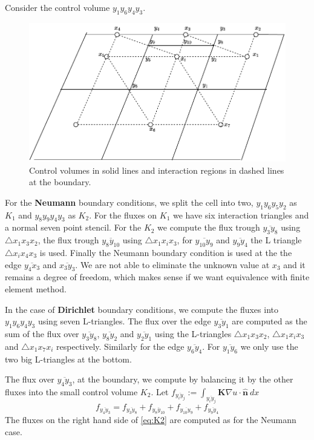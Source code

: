 \documentclass[../Main/main.tex]{subfiles}
\begin{document}
	Consider the control volume $y_1 y_6 y_4 y_3$. 
	\begin{figure}[H]
		\centering
		\includegraphics{modified_L_scheme.pdf}
		\caption{Control volumes in solid lines and interaction regions in dashed lines at the boundary.}
	\end{figure}
	For the \textbf{Neumann} boundary conditions, we split the cell into two, $y_1 y_6 y_5 y_2$ as $K_1$ and $y_8 y_9 y_4 y_3$ as  $K_2$. For the fluxes on $K_1$ we have six interaction triangles and a normal seven point stencil. For the $K_2$ we compute the flux trough $\overline{y_3 y_8}$ using $\triangle x_1 x_3 x_2$, the flux trough $\overline{y_8 y_{10}}$ using $\triangle x_1 x_i x_3$, for $\overline{y_{10}y_9}$ and $\overline{y_9 y_4}$ the L triangle  $\triangle x_i x_4 x_3$ is used. Finally the Neumann boundary condition is used at the the edge $\overline{y_4 x_3}$ and $\overline{x_3 y_3}$. We are not able to eliminate the unknown value at $x_3$ and it remains a degree of freedom, which makes sense if we want equivalence with finite element method.
	\par
	In the case of \textbf{Dirichlet} boundary conditions, we compute the fluxes into $y_1 y_6 y_4 y_3$ using seven L-triangles. The flux over the edge $\overline{y_3 y_1}$ are computed as the sum of the flux over $\overline{y_3 y_8}$, $\overline{y_8 y_2}$ and $\overline{y_2 y_1}$ using the L-triangles $\triangle x_1 x_3 x_2$, $\triangle x_1 x_i x_3$ and $\triangle x_1 x_7 x_i$ respectively. Similarly for the edge $\overline{y_6 y_4}$. For $\overline{y_1 y_6}$ we only use the two big L-triangles at the bottom. 
	\par 
	The flux over $\overline{y_4 y_3}$, at the boundary, we compute by balancing it by the other fluxes into the small control volume $K_2$. Let $	f_{\overline{y_i y_j}}:= \int_{\overline{y_i y_j}}  \pmb{K}\nabla u \cdot \pmb{\hat{n}}\ dx $
	\begin{equation}\label{eq:K2}
		f_{\overline{y_4 y_3}} = f_{\overline{y_3 y_8}} + f_{\overline{y_8 y_{10}}}+f_{\overline{y_{10}y_9}}+f_{\overline{y_9 y_4}}
	\end{equation}
	The fluxes on the right hand side of \eqref{eq:K2} are computed as for the Neumann case.
\end{document}
